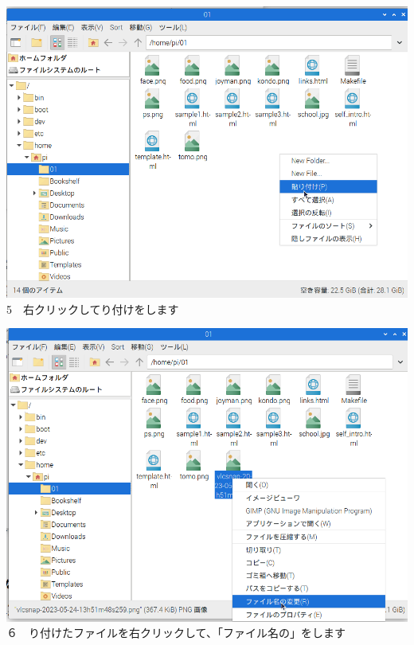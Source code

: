 \documentclass[a4paper,12pt]{jarticle}
\begin{document}
\bigskip


\bigskip


\bigskip

\centering
\begin{minipage}{0.45\linewidth}
  \includegraphics[width=\linewidth]{textbook-img168.png}\\
  5　右クリックしてり付けをします
\end{minipage}
\hfill
\vspace{20pt}
\begin{minipage}{0.45\linewidth}
  \includegraphics[width=\linewidth]{textbook-img169.png}\\
  ６　り付けたファイルを右クリックして、「ファイル名の」をします
\end{minipage}
\end{document}
